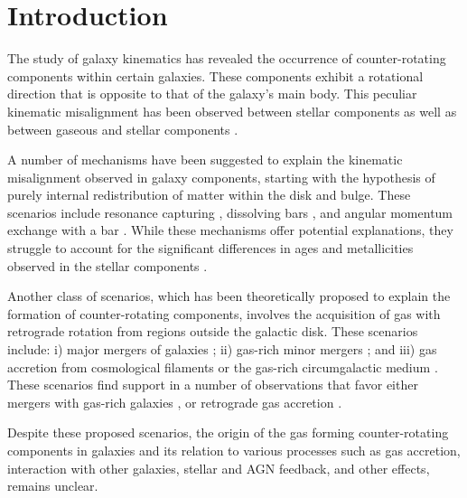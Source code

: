 \documentclass[12pt,preprint]{aa}
\begin{document}

\section{Introduction}

The study of galaxy kinematics has revealed the occurrence of counter-rotating components within certain galaxies. These components exhibit a rotational direction that is opposite to that of the galaxy's main body. This peculiar kinematic misalignment has been observed between stellar components \citep{Rubin1992, Rix1992, Bertola1996, Coccato2011, Johnston2013, Krajnovic2015} as well as between gaseous and stellar components \citep{Bettoni1984, Galletta1987, Ciri1995, Davis2011, Chung2012, Pizzella2018}.

A number of mechanisms have been suggested to explain the kinematic misalignment observed in galaxy components, starting with the hypothesis of purely internal redistribution of matter within the disk and bulge. These scenarios include resonance capturing \citep{Tremaine2000}, dissolving bars \citep{Evans1994}, and angular momentum exchange with a bar \citep{Pfenniger1991}. While these mechanisms offer potential explanations, they struggle to account for the significant differences in ages and metallicities observed in the stellar components \citep{Pizzella2014, Nedelchev2019}.

Another class of scenarios, which has been theoretically proposed to explain the formation of counter-rotating components, involves the acquisition of gas with retrograde rotation from regions outside the galactic disk. These scenarios include: i) major mergers of galaxies \citep{Puerari2001}; ii) gas-rich minor mergers \citep{Thakar1998, Bassett2017}; and iii) gas accretion from cosmological filaments or the gas-rich circumgalactic medium \citep{Algorry2014, Khoperskov2021}. These scenarios find support in a number of observations that favor either mergers with gas-rich galaxies \citep{Thakar1997, DiMatteo2008, Saburova2018}, or retrograde gas accretion \citep{Thakar1998, Chung2012, Nedelchev2019, Osman2017, Pizzella2018, Bevacqua2022}.

Despite these proposed scenarios, the origin of the gas forming counter-rotating components in galaxies and its relation to various processes such as gas accretion, interaction with other galaxies, stellar and AGN feedback, and other effects, remains unclear.
\end{document}
